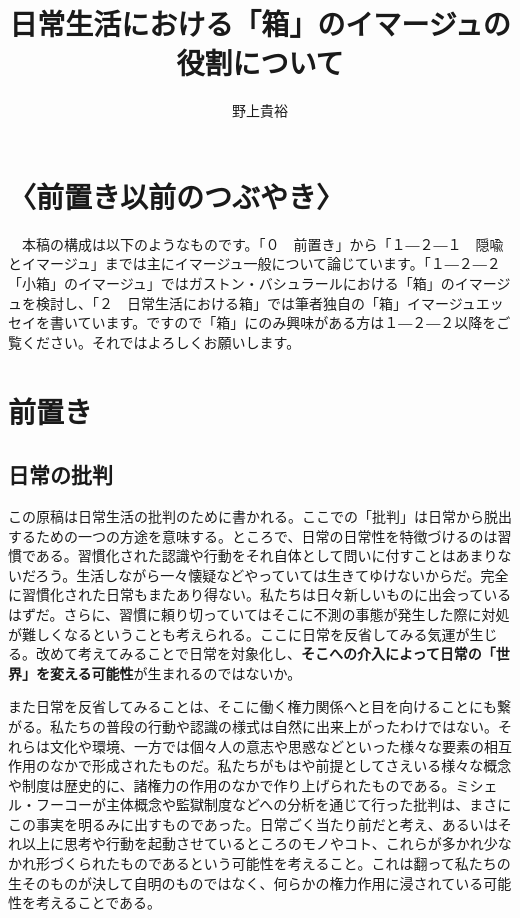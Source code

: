 \documentclass[b5j,twoside,twocolumn]{utarticle}
\title{日常生活における「箱」のイマージュの役割について}
\author{野上貴裕}
\date{\vspace{-5mm}}
\makeatletter
\def\yakuchu{%
\@ifnextchar[\@xfootnote %
{\stepcounter{yakuchu}%
\protected@xdef\@thefnmark{\theyakuchu}%
\@footnotemark\@footnotetext}}
\makeatother
\begin{document}
\maketitle

\setlength{\footskip}{-2mm}
\chead[]{}
\lfoot[]{\thepage{}}
\cfoot[]{}
\rfoot[\thepage{}]{}

\renewcommand{\thesection}{\pbox<y>{\arabic{section}}}
\renewcommand{\thesubsection}{\thesection―\pbox<y>{\arabic{subsection}}} 
\renewcommand{\thesubsubsection}{\thesubsection―\pbox<y>{\arabic{subsubsection}}} 

\let\yakuchu=\endnote
\renewcommand{\footnoterule}{\noindent\rule{100mm}{0.3mm}\vskip2mm}
\thispagestyle{fancy}
\section*{〈前置き以前のつぶやき〉}
　本稿の構成は以下のようなものです。「０　前置き」から「１―２―１　隠喩とイマージュ」までは主にイマージュ一般について論じています。「１―２―２　「小箱」のイマージュ」ではガストン・バシュラールにおける「箱」のイマージュを検討し、「２　日常生活における箱」では筆者独自の「箱」イマージュエッセイを書いています。ですので「箱」にのみ興味がある方は１―２―２以降をご覧ください。それではよろしくお願いします。
\setcounter{section}{-1}
\section{前置き}
\subsection{日常の批判}
この原稿は日常生活の批判のために書かれる。ここでの「批判」は日常から脱出するための一つの方途を意味する。ところで、日常の日常性を特徴づけるのは習慣である。習慣化された認識や行動をそれ自体として問いに付すことはあまりないだろう。生活しながら一々懐疑などやっていては生きてゆけないからだ。完全に習慣化された日常もまたあり得ない。私たちは日々新しいものに出会っているはずだ。さらに、習慣に頼り切っていてはそこに不測の事態が発生した際に対処が難しくなるということも考えられる。ここに日常を反省してみる気運が生じる。改めて考えてみることで日常を対象化し、\textbf{そこへの介入によって日常の「世界」を変える可能性}が生まれるのではないか。


また日常を反省してみることは、そこに働く権力関係へと目を向けることにも繋がる。私たちの普段の行動や認識の様式は自然に出来上がったわけではない。それらは文化や環境、一方では個々人の意志や思惑などといった様々な要素の相互作用のなかで形成されたものだ。私たちがもはや前提としてさえいる様々な概念や制度は歴史的に、諸権力の作用のなかで作り上げられたものである。ミシェル・フーコーが主体概念や監獄制度などへの分析を通じて行った批判は、まさにこの事実を明るみに出すものであった。日常ごく当たり前だと考え、あるいはそれ以上に思考や行動を起動させているところのモノやコト、これらが多かれ少なかれ形づくられたものであるという可能性を考えること。これは翻って私たちの生そのものが決して自明のものではなく、何らかの権力作用に浸されている可能性を考えることである。
\end{document}
